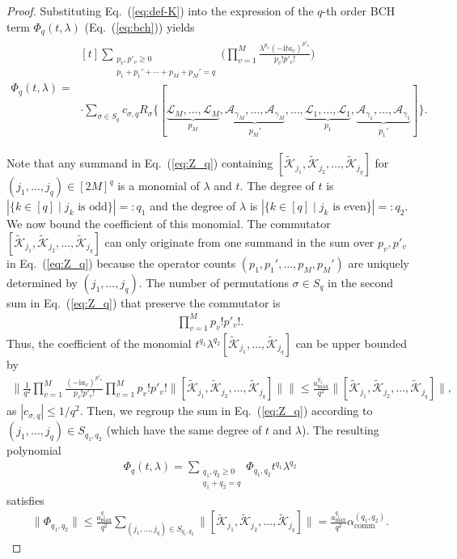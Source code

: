 \documentclass[aps,pra,reprint,groupedaddress,floatfix]{revtex4-2}
\newcommand{\eq}[1]{(\ref{eq:#1})}
\renewcommand{\i}{\mathrm{i}}
\newcommand{\A}{\mathcal{A}}
\renewcommand{\comm}{\mathrm{comm}}
\newcommand{\mc}{\mathcal}
\begin{document}
\begin{proof}
 	Substituting Eq.~\eq{def-K} into the expression of the $q$-th order BCH term $\Phi_q(t,\lambda)$ (Eq.~\eq{bch}) yields 
 	\begin{align}
 	 	\Phi_q(t,\lambda)
 	 	=~ \begin{multlined}[t]
 	 	 	\sum_{\substack{p_v,p'_v\ge 0\\ p_1+p_1'+\cdots+p_M+p_M'=q }}\bigg(\prod_{v=1}^M \frac{\lambda^{p_v}(-\i ta_v)^{p'_v}}{p_v!p'_v!} \bigg) \\ 
 	 	\cdot \sum_{\sigma\in S_q} c_{\sigma, q}R_{\sigma}\big\{[\underbrace{\mc L_M, \ldots,\mc L_M}_{p_M}, \underbrace{\A_{\gamma_M}, \ldots, \mc A_{\gamma_M}}_{p_M'}, \ldots, \underbrace{ \mc L_1,  \ldots, \mc L_1}_{p_1}, \underbrace{\A_{\gamma_1},  \ldots, \mc A_{\gamma_1}}_{p_1'}]\big\}.\label{eq:Z_q}\end{multlined}
 	\end{align}
 	
 	Note that any summand in Eq.~\eq{Z_q} containing $[\tilde{\mc K}_{j_1}, \tilde{\mc K}_{j_2}, \ldots, \tilde{\mc K}_{j_q}]$ for $(j_1, \ldots, j_q)\in [2M]^q$ is a monomial of $\lambda$ and $t$. The degree of $t$ is $|\{k\in [q]\mid j_k \text{ is odd}\}|=: q_1$ and the degree of $\lambda$ is $|\{k\in [q]\mid j_k \text{ is even}\}|=: q_2$. We now bound the coefficient of this monomial. The commutator $[\tilde{\mc K}_{j_1}, \tilde{\mc K}_{j_2}, \ldots, \tilde{\mc K}_{j_q}]$ can only originate from one summand in the sum over $p_v, p'_v$ in Eq.~\eq{Z_q} because the operator counts $(p_1, p_1', \ldots, p_M, p_M')$ are uniquely determined by $(j_1, \ldots, j_q)$. The number of permutations $\sigma\in S_q$ in the second sum in Eq.~\eq{Z_q} that preserve the commutator is
 	\begin{align*}
 	 	\prod_{v=1}^M p_v!p'_v!.
 	\end{align*}
 	Thus, the coefficient of the monomial $t^{q_1}\lambda^{q_2}[\tilde{\mc K}_{j_1}, \ldots, \tilde{\mc K}_{j_q}]$ can be upper bounded by
 	\begin{align*}
 	 	\bigg\|\frac{1}{q^2}\prod_{v=1}^M \frac{(-\i a_v)^{p'_v}}{p_v!p'_v!}\prod_{v=1}^M p_v!p'_v!\big\|[\tilde{\mc K}_{j_1}, \tilde{\mc K}_{j_2}, \ldots, \tilde{\mc K}_{j_q}]\big\|\bigg\| \le \frac{a_{\max}^{q_1}}{q^2}  \big\|[\tilde{\mc K}_{j_1}, \tilde{\mc K}_{j_2}, \ldots, \tilde{\mc K}_{j_q}]\big\|,
 	\end{align*}
 	as $|c_{\sigma, q}|\le 1/q^2$. Then, we regroup the sum in Eq.~\eq{Z_q} according to $(j_1, \ldots, j_q)\in S_{q_1, q_2}$ (which have the same degree of $t$ and $\lambda$). The resulting polynomial
 	\begin{align*}
 	 	\Phi_q(t,\lambda) = \sum_{\substack{q_1, q_2 \ge 0\\q_1+q_2 = q}}\Phi_{q_1, q_2} t^{q_1}\lambda^{q_2}
 	\end{align*}
 	satisfies
 	\begin{align*}
 	 	\|\Phi_{q_1, q_2}\|\le  \frac{a_{\max}^{q_1}}{q^2}\sum_{(j_1, \ldots, j_q)\in S_{q_1, q_2}} \big\|[\tilde{\mc K}_{j_1}, \tilde{\mc K}_{j_2}, \ldots, \tilde{\mc K}_{j_q}]\big\| = \frac{a_{\max}^{q_1}}{q^2}\alpha_{\comm}^{(q_1, q_2)}.
 	\end{align*}
\end{proof}
\end{document}
